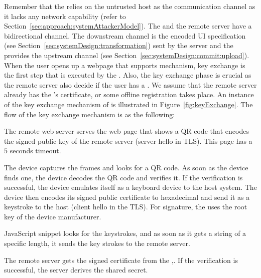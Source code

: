 Remember that the \device relies on the untrusted host as the communication channel as it lacks any network capability (refer to Section~\ref{sec:approach:systemAttackerModel}). The \device and the remote server have a bidirectional channel. The downstream channel is the encoded UI specification (see Section~\ref{sec:systemDesign:transformation}) sent by the server and the \name \js provides the upstream channel (see Section~\ref{sec:systemDesign:commit:upload}). 
When the user opens up a webpage that supports \name mechanism, key exchange is the first step that is executed by the \device. Also, the key exchange phase is crucial as the remote server also decide if the user has a \device. We assume that the remote server already has the \device's certificate, or some offline registration takes place. An instance of the key exchange mechanism of \name is illustrated in Figure~\ref{fig:keyExchange}. The flow of the key exchange mechanism is as the following:

\begin{mylist}
  \item[\one] The remote web server serves the web page that shows a QR code that encodes the signed public key of the remote server (server hello in TLS). This page has a $5$ seconds timeout.
  \item[\two] The device captures the frames and looks for a QR code. As soon as the device finds one, the device decodes the QR code and verifies it. If the verification is successful, the device emulates itself as a keyboard device to the host system. The device then encodes its signed public certificate to hexadecimal and send it as a keystroke to the host (client hello in the TLS). For signature, the \device uses the root key of the device manufacturer.
  \item[\three] \name  JavaScript snippet looks for the keystrokes, and as soon as it gets a string of a specific length, it sends the key strokes to the remote server.
  \item[\four] The remote server gets the signed certificate from the \device,. If the verification is successful, the server derives the shared secret.
 
\end{mylist}

